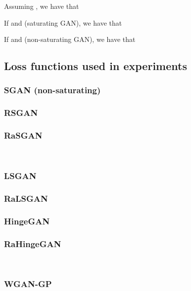 \documentclass{article}
\begin{document}
Assuming , we have that


If  and  (saturating GAN), we have that


If  and  (non-saturating GAN), we have that


\subsection{Loss functions used in experiments}

\subsubsection{SGAN (non-saturating)}

 


\subsubsection{RSGAN}




\subsubsection{RaSGAN}

 

 \\ 

\subsubsection{LSGAN}

 


\subsubsection{RaLSGAN}

 


\subsubsection{HingeGAN}

 


\subsubsection{RaHingeGAN}

 

 \\


\subsubsection{WGAN-GP}
\end{document}
